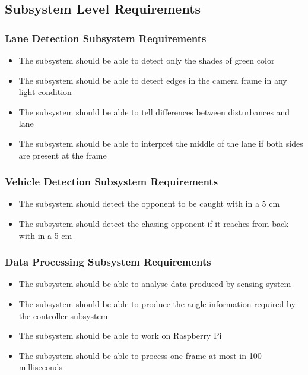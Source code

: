 \documentclass[a4paper,12pt]{article}
\begin{document}
		


	\subsection{Subsystem Level Requirements}
	
		\subsubsection{Lane Detection Subsystem Requirements}	
		
			\begin{itemize}
				\item The subsystem should be able to detect only the shades of green color
				\item The subsystem should be able to detect edges in the camera frame in any light condition
				\item The subsystem should be able to tell differences between disturbances and lane
				\item The subsystem should be able to interpret the middle of the lane if both sides are present at the frame
			\end{itemize}
	 
	 
	\subsubsection{Vehicle Detection Subsystem Requirements}
	
		\begin{itemize}
				\item The subsystem should detect the opponent to be caught with in a 5 cm 
				\item The subsystem should detect the chasing opponent if it reaches from back with in a 5 cm  
			\end{itemize}
		
		
				
	
	
		\subsubsection{Data Processing Subsystem Requirements}	
	
			\begin{itemize}
				\item The subsystem should be able to analyse data produced by sensing system
				\item The subsystem should be able to produce the angle information required by the controller subsystem
				\item The subsystem should be able to work on Raspberry Pi
				\item The subsystem should be able to process one frame at most in 100 milliseconds
			\end{itemize}
		
\end{document}
